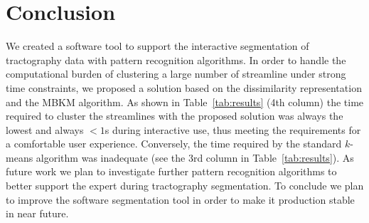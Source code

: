 \section{Conclusion}
\label{sec:discussion}
We created a software tool to support the interactive segmentation of
tractography data with pattern recognition algorithms. In order to
handle the computational burden of clustering a large number of
streamline under strong time constraints, we proposed a solution based
on the dissimilarity representation and the MBKM algorithm. As shown
in Table~\ref{tab:results} (4th column) the time required to cluster
the streamlines with the proposed solution was always the lowest and
always $<1$s during interactive use, thus meeting the requirements for
a comfortable user experience. Conversely, the time required by the
standard $k$-means algorithm was inadequate (see the 3rd column in
Table~\ref{tab:results}).
As future work we plan to investigate further pattern recognition
algorithms to better support the expert during tractography
segmentation. 
To conclude we plan to improve the software segmentation tool in order
to make it production stable in near future.


